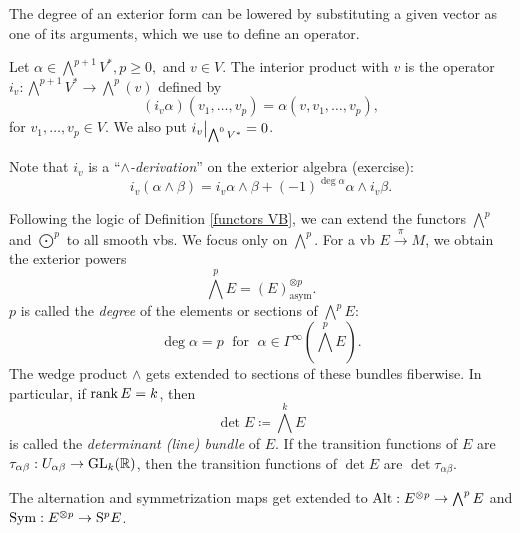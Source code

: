 The degree of an exterior form can be lowered by substituting a given vector as one of its arguments, which we use to define an operator.

\begin{defn}
    Let $\alpha\in\bigwedge^{p+1}V^\ast, p\geq 0,$ and $v\in V$. The interior product with $v$ is the operator $i_v:\bigwedge^{p+1}V^\ast\to \bigwedge^p(v)$ defined by 
    \[(i_v \alpha)(v_1,\ldots,v_p)=\alpha(v,v_1,\ldots,v_p),\]
    for $v_1,\ldots,v_p\in V$. We also put $\restr{i_v}{\bigwedge^0V^\ast}=0$.
\end{defn}

Note that $i_v$ is a ``\emph{$\wedge$-derivation}'' on the exterior algebra (exercise):
\[i_v(\alpha\wedge\beta)=i_v\alpha\wedge\beta+(-1)^{\deg \alpha}\alpha\wedge i_v\beta.\label{eq interior product derivation}\]

\begin{defn}
Following the logic of Definition \ref{functors VB}, we can extend the functors $\bigwedge^p$ and $\bigodot^p$ to all smooth \glspl{vb}. We focus only on $\bigwedge^p$. For a \gls{vb} $E\overset{\pi}{\to} M$, we obtain the exterior powers
\[\bigwedge^p E=(E)^{\otimes p}_{\text{asym}}.\]
$p$ is called the \emph{degree} of the elements or sections of $\bigwedge^p E$: \[\deg \alpha=p\;\text{ for }\;\alpha\in\Gamma^\infty\left(\bigwedge^p E\right).\]
The wedge product $\wedge$ gets extended to sections of these bundles fiberwise.
In particular, if $\operatorname{rank} E=k$, then \[\det E\coloneqq \bigwedge^k E\] is called the \emph{determinant (line) bundle} of $E$. If the transition functions of $E$ are $\tau_{\alpha\beta}:U_{\alpha\beta}\to \operatorname{GL}_k(\mathbb{R} )$, then the transition functions of $\det E$ are $\det \tau_{\alpha\beta}$.

The alternation and symmetrization maps get extended to $\operatorname{Alt}: E^{\otimes p}\to \bigwedge^p E$ and $\operatorname{Sym}: E^{\otimes p}\to \mathrm{S}^p E$.
\end{defn}

